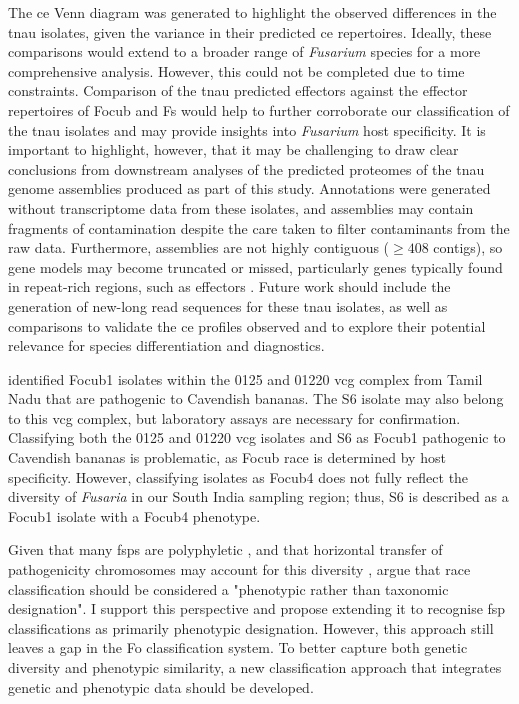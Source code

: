 The \ac{ce} Venn diagram was generated to highlight the observed differences in the \ac{tnau} isolates, given the variance in their predicted \ac{ce} repertoires. Ideally, these comparisons would extend to a broader range of \textit{Fusarium} species for a more comprehensive analysis. However, this could not be completed due to time constraints. Comparison of the \ac{tnau} predicted effectors against the effector repertoires of \ac{Focub} and \ac{Fs} would help to further corroborate our classification of the \ac{tnau} isolates and may provide insights into \textit{Fusarium} host specificity. It is important to highlight, however, that it may be challenging to draw clear conclusions from downstream analyses of the predicted proteomes of the \ac{tnau} genome assemblies produced as part of this study. Annotations were generated without transcriptome data from these isolates, and assemblies may contain fragments of contamination despite the care taken to filter contaminants from the raw data. Furthermore, assemblies are not highly contiguous ($\geq408$ contigs), so gene models may become truncated or missed, particularly genes typically found in repeat-rich regions, such as effectors \parencite{Schmidt2013}. Future work should include the generation of new-long read sequences for these \ac{tnau} isolates, as well as comparisons to validate the \ac{ce} profiles observed and to explore their potential relevance for species differentiation and diagnostics. 

\textcite{Thangavelu2020} identified \ac{Focub1} isolates within the 0125 and 01220 \ac{vcg} complex from Tamil Nadu that are pathogenic to Cavendish bananas. The S6 isolate may also belong to this \ac{vcg} complex, but laboratory assays are necessary for confirmation. Classifying both the 0125 and 01220 \ac{vcg} isolates and S6 as \ac{Focub1} pathogenic to Cavendish bananas is problematic, as \ac{Focub} race is determined by host specificity. However, classifying isolates as \ac{Focub4} does not fully reflect the diversity of \textit{Fusaria} in our South India sampling region; thus, S6 is described as a \ac{Focub1} isolate with a \ac{Focub4} phenotype. 

Given that many \acp{fsp} are polyphyletic \parencite{Czislowski2018, Henry2021, jerushalmi2022members}, and that horizontal transfer of pathogenicity chromosomes may account for this diversity \parencite{Fourie2009, Schmidt2013, Chiara2015, Epstein2022}, \textcite{Torres2021} argue that race classification should be considered a "phenotypic rather than taxonomic designation". I support this perspective and propose extending it to recognise \ac{fsp} classifications as primarily phenotypic designation. However, this approach still leaves a gap in the \ac{Fo} classification system. To better capture both genetic diversity and phenotypic similarity, a new classification approach that integrates genetic and phenotypic data should be developed.

